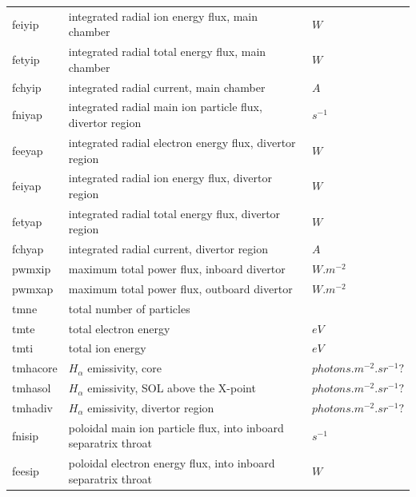 \documentclass[a4paper,10pt]{report}
\begin{document}
\begin{center}
\begin{longtable}{|l|l|l|}
feiyip \index{feiyip}\index{b2time.nc, feiyip} & integrated radial ion energy flux, main chamber & $W $ \\
fetyip \index{fetyip}\index{b2time.nc, fetyip} & integrated radial total energy flux, main chamber & $W $ \\
fchyip \index{fchyip}\index{b2time.nc, fchyip} & integrated radial current, main chamber & $A $ \\
fniyap \index{fniyap}\index{b2time.nc, fniyap} & integrated radial main ion particle flux, divertor region & $s^{-1}$ \\
feeyap \index{feeyap}\index{b2time.nc, feeyap} & integrated radial electron energy flux, divertor region & $W $ \\
feiyap \index{feiyap}\index{b2time.nc, feiyap} & integrated radial ion energy flux, divertor region & $W $ \\
fetyap \index{fetyap}\index{b2time.nc, fetyap} & integrated radial total energy flux, divertor region & $W $ \\
fchyap \index{fchyap}\index{b2time.nc, fchyap} & integrated radial current, divertor region & $A $ \\
pwmxip \index{pwmxip}\index{b2time.nc, pwmxip} & maximum total power flux, inboard divertor & $W.m^{-2}$ \\
pwmxap \index{pwmxap}\index{b2time.nc, pwmxap} & maximum total power flux, outboard divertor & $W.m^{-2}$ \\
tmne \index{tmne}\index{b2time.nc, tmne} & total number of particles & $  $ \\
tmte \index{tmte}\index{b2time.nc, tmte} & total electron energy & $eV$ \\
tmti \index{tmti}\index{b2time.nc, tmti} & total ion energy & $eV$ \\
tmhacore \index{tmhacore}\index{b2time.nc, tmhacore} & $H_\alpha$ emissivity, core & $photons.m^{-2}.sr^{-1}?$ \\
tmhasol \index{tmhasol}\index{b2time.nc, tmhasol} & $H_\alpha$ emissivity, SOL above the X-point & $photons.m^{-2}.sr^{-1}?$ \\
tmhadiv \index{tmhadiv}\index{b2time.nc, tmhadiv} & $H_\alpha$ emissivity, divertor region & $photons.m^{-2}.sr^{-1}?$ \\
fnisip \index{fnisip}\index{b2time.nc, fnisip} & poloidal main ion particle flux, into inboard separatrix throat & $s^{-1}$ \\
feesip \index{feesip}\index{b2time.nc, feesip} & poloidal electron energy flux, into inboard separatrix throat & $W $ \\

\end{longtable}
\end{center}
\end{document}
